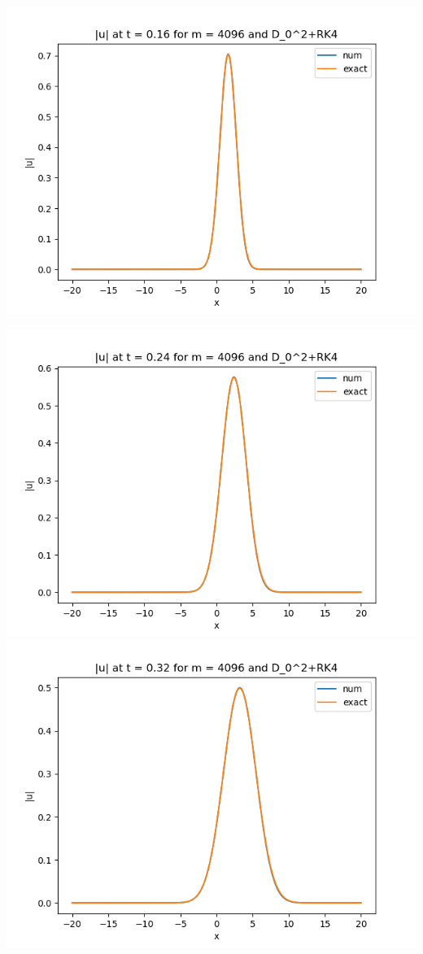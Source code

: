\documentclass{article}
\begin{document}
\begin{enumerate}[label=(\alph*)]
\begin{center}
	\includegraphics[scale=.3]{FINAL u_abs t = 0.16 m = 4096 D02+RK4}
\end{center}
\begin{center}
	\includegraphics[scale=.3]{FINAL u_abs t = 0.24 m = 4096 D02+RK4}
	\includegraphics[scale=.3]{FINAL u_abs t = 0.32 m = 4096 D02+RK4}

\end{center}
\end{enumerate}
\end{document}
